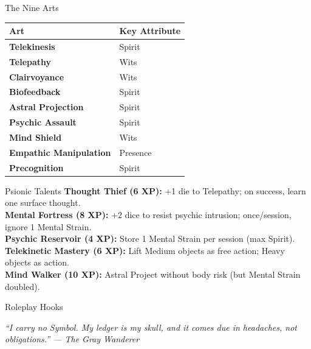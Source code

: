 \documentclass[10pt]{article}
\begin{document}
\begin{minipage}[t]{0.48\linewidth}
    \begin{charbox}{The Nine Arts}
        \begin{tabular}{>{\bfseries}p{3cm} p{4.5cm}}
            \toprule
            \textbf{Art} & \textbf{Key Attribute} \\
            \midrule
            Telekinesis & Spirit \\
            Telepathy & Wits \\
            Clairvoyance & Wits \\
            Biofeedback & Spirit \\
            Astral Projection & Spirit \\
            Psychic Assault & Spirit \\
            Mind Shield & Wits \\
            Empathic Manipulation & Presence \\
            Precognition & Spirit \\
            \bottomrule
        \end{tabular}
    \end{charbox}
    
    \vspace{0.5em}
    
    \begin{charbox}{Psionic Talents}
        \textbf{Thought Thief (6 XP):} +1 die to Telepathy; on success, learn one surface thought.\\
        \textbf{Mental Fortress (8 XP):} +2 dice to resist psychic intrusion; once/session, ignore 1 Mental Strain.\\
        \textbf{Psychic Reservoir (4 XP):} Store 1 Mental Strain per session (max Spirit).\\
        \textbf{Telekinetic Mastery (6 XP):} Lift Medium objects as free action; Heavy objects as action.\\
        \textbf{Mind Walker (10 XP):} Astral Project without body risk (but Mental Strain doubled).
    \end{charbox}
    
    \vspace{0.5em}
    
    \begin{charbox}{Roleplay Hooks}
        \underline{\hspace{7cm}}\\
        \underline{\hspace{7cm}}
    \end{charbox}
\end{minipage}

\vspace{1em}
\begin{center}
    {\small\sffamily\itshape ``I carry no Symbol. My ledger is my skull, and it comes due in headaches, not obligations.'' --- The Gray Wanderer}
\end{center}
\end{document}

